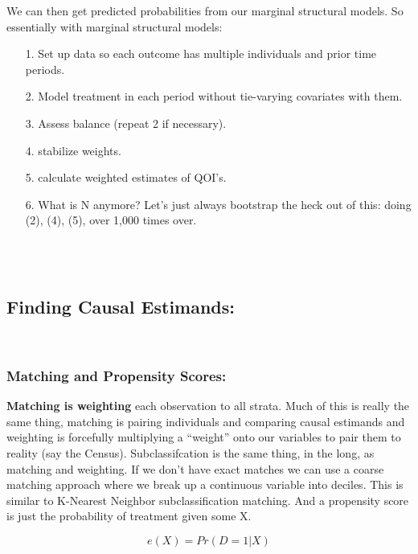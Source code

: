 \documentclass[12pt]{article}\usepackage[]{graphicx}\usepackage[]{color}
\begin{document}
\begin{flushleft}
We can then get predicted probabilities from our marginal structural models. So essentially with marginal structural models:

\begin{itemize}
\item[1.] Set up data so each outcome has multiple individuals and prior time periods.
\item[2.] Model treatment in each period without tie-varying covariates with them.
\item[3.] Assess balance (repeat 2 if necessary).
\item[4.] stabilize weights.
\item[5.] calculate weighted estimates of QOI's.
\item[6.] What is N anymore? Let's just always bootstrap the heck out of this: doing (2), (4), (5), over 1,000 times over.
\end{itemize}

\hfill \\
\hfill \\


\subsection{Finding Causal Estimands:}

\hfill \\

\subsubsection{Matching and Propensity Scores:}

\textbf{Matching is weighting} each observation to all strata. Much of this is really the same thing, matching is pairing individuals and comparing causal estimands and weighting is forcefully multiplying a ``weight'' onto our variables to pair them to reality (say the Census). Subclassifcation is the same thing, in the long, as matching and weighting. If we don't have exact matches we can use a coarse matching approach where we break up a continuous variable into deciles. This is similar to K-Nearest Neighbor subclassification matching.  And a propensity score is just the probability of treatment given some X. 

\begin{equation}
e(X) = Pr(D = 1|X)
\end{equation}


\end{flushleft}
\end{document}
